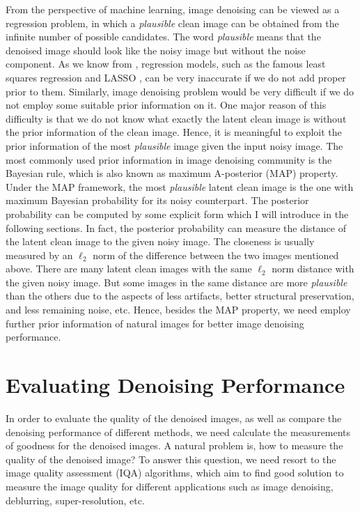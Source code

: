 From the perspective of machine learning, image denoising can be viewed as a regression problem, in which a \textsl{plausible} clean image can be obtained from the infinite number of possible candidates. The word \textsl{plausible} means that the denoised image should look like the noisy image but without the noise component. As we know from \cite{prml}, regression models, such as the famous least squares regression and LASSO \cite{lasso}, can be very inaccurate if we do not add proper prior to them. Similarly, image denoising problem would be very difficult if we do not employ some suitable prior information on it. One major reason of this difficulty is that we do not know what exactly the latent clean image is without the prior information of the clean image. Hence, it is meaningful to exploit the prior information of the most \textsl{plausible} image given the input noisy image. The most commonly used prior information in image denoising community is the Bayesian rule, which is also known as maximum A-posterior (MAP) property. Under the MAP framework, the most \textsl{plausible} latent clean image is the one with maximum Bayesian probability for its noisy counterpart. The posterior probability can be computed by some explicit form which I will introduce in the following sections. In fact, the posterior probability can measure the distance of the latent clean image to the given noisy image. The closeness is usually measured by an $\ell_{2}$ norm of the difference between the two images mentioned above. There are many latent clean images with the same $\ell_{2}$ norm distance with the given noisy image. But some images in the same distance are more \textsl{plausible} than the others due to the aspects of less artifacts, better structural preservation, and less remaining noise, etc. Hence, besides the MAP property, we need employ further prior information of natural images for better image denoising performance.

\section{Evaluating Denoising Performance}

In order to evaluate the quality of the denoised images, as well as compare the denoising performance of different methods, we need calculate the measurements of goodness for the denoised images. A natural problem is, how to measure the quality of the denoised image? To answer this question, we need resort to the image quality assessment (IQA) algorithms, which aim to find good solution to measure the image quality for different applications such as image denoising, deblurring, super-resolution, etc. 

